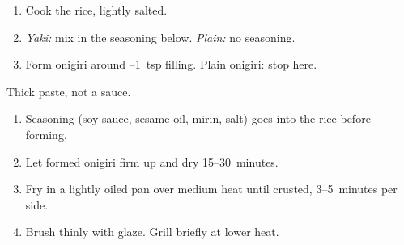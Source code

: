 \label{onigiri}


\begin{ingredients}
\end{ingredients}

\begin{recipe}
  \begin{enumerate}

  \item Cook the rice, lightly salted.

  \item \emph{Yaki:} mix in the seasoning below.  \emph{Plain:} no
    seasoning.

  \item Form onigiri around \fracH--1~tsp filling.  Plain onigiri: stop
    here.

  \end{enumerate}
\end{recipe}


\begin{ingredients}
\end{ingredients}

Thick paste, not a sauce.


\begin{ingredients}
\end{ingredients}

\begin{recipe}
  \begin{enumerate}

  \item Seasoning (soy sauce, sesame oil, mirin, salt) goes into the
    rice before forming.

  \item Let formed onigiri firm up and dry 15--30~minutes.

  \item Fry in a lightly oiled pan over medium heat until crusted,
    3--5~minutes per side.

  \item Brush thinly with glaze.  Grill briefly at lower heat.

  \end{enumerate}
\end{recipe}


